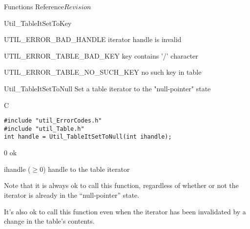 \begin{cactuspart}{ Functions Reference}{}{$Revision$}
\begin{FunctionDescription}{Util\_TableItSetToKey}
\begin{ErrorSection}
\begin{Error}{UTIL\_ERROR\_BAD\_HANDLE}
iterator handle is invalid
\end{Error}
\begin{Error}{UTIL\_ERROR\_TABLE\_BAD\_KEY}
key contains '/' character
\end{Error}
\begin{Error}{UTIL\_ERROR\_TABLE\_NO\_SUCH\_KEY}
no such key in table
\end{Error}
\end{ErrorSection}
\end{FunctionDescription}


\begin{FunctionDescription}{Util\_TableItSetToNull}
\label{Util-TableItSetToNull}
Set a table iterator to the "null-pointer" state

\begin{SynopsisSection}
\begin{Synopsis}{C}
\begin{verbatim}
#include "util_ErrorCodes.h"
#include "util_Table.h"
int handle = Util_TableItSetToNull(int ihandle);
\end{verbatim}
\end{Synopsis}
\end{SynopsisSection}

\begin{ResultSection}
\begin{Result}{\rm 0}
ok
\end{Result}
\end{ResultSection}

\begin{ParameterSection}
\begin{Parameter}{ihandle ($\ge 0$)}
handle to the table iterator
\end{Parameter}
\end{ParameterSection}

\begin{Discussion}
Note that it is always ok to call this function, regardless of
whether or not the iterator is already in the ``null-pointer'' state.

It's also ok to call this function even when the iterator has been
invalidated by a change in the table's contents.
\end{Discussion}


\end{FunctionDescription}
\end{cactuspart}
